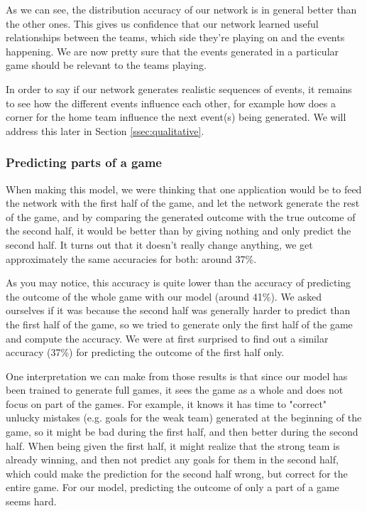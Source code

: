 \documentclass[10pt,conference,onecolumn]{IEEEtran}
\begin{document}
As we can see, the distribution accuracy of our network is in general better than the other ones. This gives us confidence that our network learned useful relationships between the teams, which side they're playing on and the events happening. We are now pretty sure that the events generated in a particular game should be relevant to the teams playing.

In order to say if our network generates realistic sequences of events, it remains to see how the different events influence each other, for example how does a corner for the home team influence the next event(s) being generated. We will address this later in Section \ref{ssec:qualitative}.
\newline

\subsubsection{Predicting parts of a game}
When making this model, we were thinking that one application would be to feed the network with the first half of the game, and let the network generate the rest of the game, and by comparing the generated outcome with the true outcome of the second half, it would be better than by giving nothing and only predict the second half. It turns out that it doesn't really change anything, we get approximately the same accuracies for both: around 37\%.

As you may notice, this accuracy is quite lower than the accuracy of predicting the outcome of the whole game with our model (around 41\%). We asked ourselves if it was because the second half was generally harder to predict than the first half of the game, so we tried to generate only the first half of the game and compute the accuracy. We were at first surprised to find out a similar accuracy (37\%) for predicting the outcome of the first half only.

One interpretation we can make from those results is that since our model has been trained to generate full games, it sees the game as a whole and does not focus on part of the games. For example, it knows it has time to "correct" unlucky mistakes (e.g. goals for the weak team) generated at the beginning of the game, so it might be bad during the first half, and then better during the second half. When being given the first half, it might realize that the strong team is already winning, and then not predict any goals for them in the second half, which could make the prediction for the second half wrong, but correct for the entire game. For our model, predicting the outcome of only a part of a game seems hard.
\end{document}
